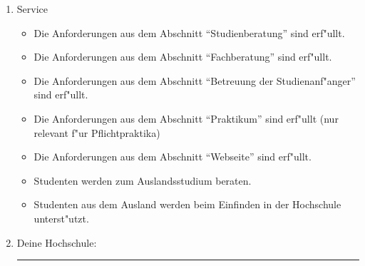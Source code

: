 \documentclass[a4paper,11pt]{article}
\begin{document}
\begin{enumerate}
\item Service
 \begin{itemize}
 \item Die Anforderungen aus dem Abschnitt "`Studienberatung"' sind erf"ullt.
 \item Die Anforderungen aus dem Abschnitt "`Fachberatung"' sind erf"ullt.
 \item Die Anforderungen aus dem Abschnitt "`Betreuung der Studienanf"anger"' sind erf"ullt.
 \item Die Anforderungen aus dem Abschnitt "`Praktikum"' sind erf"ullt (nur relevant f"ur Pflichtpraktika)
 \item Die Anforderungen aus dem Abschnitt "`Webseite"' sind erf"ullt.
 \item Studenten werden zum Auslandsstudium beraten.
 \item Studenten aus dem Ausland werden beim Einfinden in der Hochschule unterst"utzt.
 \end{itemize}
\item Deine Hochschule:\\[2mm] \hrule
\end{enumerate}
\end{document}
